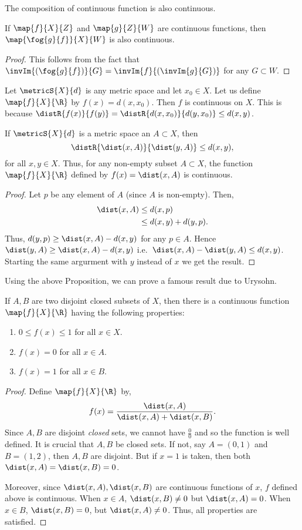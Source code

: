 The composition of continuous function is also continuous.
\begin{Proposition}
    If $\map{f}{X}{Z}$ and $\map{g}{Z}{W}$ are continuous functions, then $\map{\fog{g}{f}}{X}{W}$ is also
    continuous.
\end{Proposition}
\begin{proof}
    This follows from the fact that $\invIm{(\fog{g}{f})}{G} = \invIm{f}{\left(\invIm{g}{G}\right)}$ for any
    $G \subset W$.
\end{proof}
\begin{Example}
    Let $\metricS{X}{d}$ is any metric space and let $x_0 \in X$. Let us define $\map{f}{X}{\R}$ by
    $f(x) = d(x,x_0)$. Then $f$ is continuous on $X$. This is because $\distR{f(x)}{f(y)} =
    \distR{d(x,x_0)}{d(y,x_0)} \leq d(x,y)$.
\end{Example}
\begin{Proposition}
    If $\metricS{X}{d}$ is a metric space an $A \subset X$, then
    \[\distR{\dist(x,A)}{\dist(y,A)} \leq d(x,y),\]
    for all $x,y \in X$. Thus, for any non-empty subset $A \subset X$, the function $\map{f}{X}{\R}$ defined
    by $f(x) = \dist(x,A)$ is continuous.
\end{Proposition}
\begin{proof}
    Let $p$ be any element of $A$ (since $A$ is non-empty). Then,
    \begin{align*}
	\dist(x,A) & \leq d(x,p)\\
	& \leq d(x,y) + d(y,p).
    \end{align*}
    Thus, $d(y,p) \geq \dist(x,A) - d(x,y)$ for any $p \in A$. Hence $\dist(y,A) \geq \dist(x,A) - d(x,y)$
    i.e.~$\dist(x,A) - \dist(y,A) \leq d(x,y)$. Starting the same argurment with $y$ instead of $x$ we get the
    result.
\end{proof}
Using the above Proposition, we can prove a famous result due to Urysohn.
\begin{Theorem}
    If $A,B$ are two disjoint closed subsets of $X$, then there is a continuous function $\map{f}{X}{\R}$
    having the following properties:
    \begin{enumerate}
	\item
	    $0 \leq f(x) \leq 1$ for all $x \in X$.
	\item
	    $f(x) = 0$ for all $x \in A$.
	\item
	    $f(x) = 1$ for all $x \in B$.
    \end{enumerate}
\end{Theorem}
\begin{proof}
    Define $\map{f}{X}{\R}$ by,
    \[f(x) = \frac{\dist(x,A)}{\dist(x,A) + \dist(x,B)}.\]
    Since $A,B$ are disjoint \emph{closed} sets, we cannot have $\frac{0}{0}$ and so the function is well
    defined. It is crucial that $A,B$ be closed sets. If not, say $A = (0,1)$ and $B = (1,2)$, then $A,B$ are
    disjoint. But if $x = 1$ is taken, then both $\dist(x,A) = \dist(x,B) = 0$.

    Moreover, since $\dist(x,A),\dist(x,B)$ are continuous functions of $x$, $f$ defined above is continuous. 
    When $x \in A$, $\dist(x,B) \neq 0$ but $\dist(x,A) = 0$. When $x \in B$, $\dist(x,B) = 0$, but 
    $\dist(x,A) \neq 0$. Thus, all properties are satisfied.
\end{proof}

